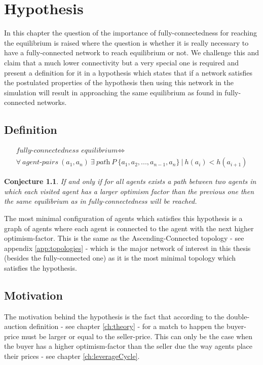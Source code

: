 \documentclass[Bachelorarbeit.tex]{subfiles}
\begin{document}
\graphicspath{{./figures/hypothesis/}}	%

\chapter{Hypothesis}
\label{ch:hypothesis}

In this chapter the question of the importance of fully-connectedness for reaching the equilibrium is raised where the question is whether it is really necessary to have a fully-connected network to reach equilibrium or not. We challenge this and claim that a much lower connectivity but a very special one is required and present a definition for it in a hypothesis which states that if a network satisfies the postulated properties of the hypothesis then using this network in the simulation will result in approaching the same equilibrium as found in fully-connected networks.

\section{Definition}

\begin{equation}
\begin{split}
\textit{fully-connectedness equilibrium} \iff \\
\forall \: \textit{agent-pairs} \: (a_{1},a_{n}) \: \exists \:  \textit{path} \: P \: \{a_{1}, a_{2}, ... , a_{n-1}, a_{n}\} \: | \: h(a_{i}) < h(a_{i+1})
\end{split}
\end{equation}

\newtheorem{conj}{Conjecture}

\begin{conj}
If and only if for all agents exists a path between two agents in which each visited agent has a larger optimism factor than the previous one then the same equilibrium as in fully-connectedness will be reached.
\end{conj}

The most minimal configuration of agents which satisfies this hypothesis is a graph of agents where each agent is connected to the agent with the next higher optimism-factor. This is the same as the Ascending-Connected topology - see appendix \ref{app:topologies} - which is the major network of interest in this thesis (besides the fully-connected one) as it is the most minimal topology which satisfies the hypothesis.

\section{Motivation}
The motivation behind the hypothesis is the fact that according to the double-auction definition - see chapter \ref{ch:theory} - for a match to happen the buyer-price must be larger or equal to the seller-price. This can only be the case when the buyer has a higher optimism-factor than the seller due the way agents place their prices - see chapter \ref{ch:leverageCycle}.
\end{document}
